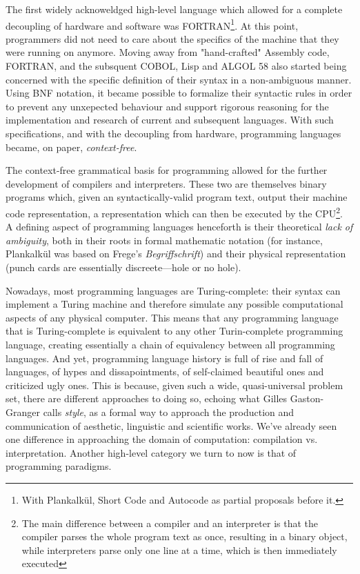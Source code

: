 \documentclass{article}
\begin{document}
The first widely acknoweldged high-level language which allowed for a complete decoupling of hardware and software was FORTRAN\footnote{With Plankalkül, Short Code and Autocode as partial proposals before it.}. At this point, programmers did not need to care about the specifics of the machine that they were running on anymore. Moving away from "hand-crafted" Assembly code, FORTRAN, and the subsquent COBOL, Lisp and ALGOL 58 also started being concerned with the specific definition of their syntax in a non-ambiguous manner. Using BNF notation, it became possible to formalize their syntactic rules in order to prevent any unxepected behaviour and support rigorous reasoning for the implementation and research of current and subsequent languages. With such specifications, and with the decoupling from hardware, programming languages became, on paper, \emph{context-free}.

The context-free grammatical basis for programming allowed for the further development of compilers and interpreters. These two are themselves binary programs which, given an syntactically-valid program text, output their machine code representation, a representation which can then be executed by the CPU\footnote{The main difference between a compiler and an interpreter is that the compiler parses the whole program text as once, resulting in a binary object, while interpreters parse only one line at a time, which is then immediately executed}. A defining aspect of programming languages henceforth is their theoretical \emph{lack of ambiguity}, both in their roots in formal mathematic notation (for instance, Plankalkül was based on Frege's \emph{Begriffschrift}) and their physical representation (punch cards are essentially discreete—hole or no hole).

Nowadays, most programming languages are Turing-complete: their syntax can implement a Turing machine and therefore simulate any possible computational aspects of any physical computer. This means that any programming language that is Turing-complete is equivalent to any other Turin-complete programming language, creating essentially a chain of equivalency between all programming languages. And yet, programming language history is full of rise and fall of languages, of hypes and dissapointments, of self-claimed beautiful ones and criticized ugly ones. This is because, given such a wide, quasi-universal problem set, there are different approaches to doing so, echoing what Gilles Gaston-Granger calls \emph{style}, as a formal way to approach the production and communication of aesthetic, linguistic and scientific works\cite{granger_essai_1988}. We've already seen one difference in approaching the domain of computation: compilation vs. interpretation. Another high-level category we turn to now is that of programming paradigms.
\end{document}
